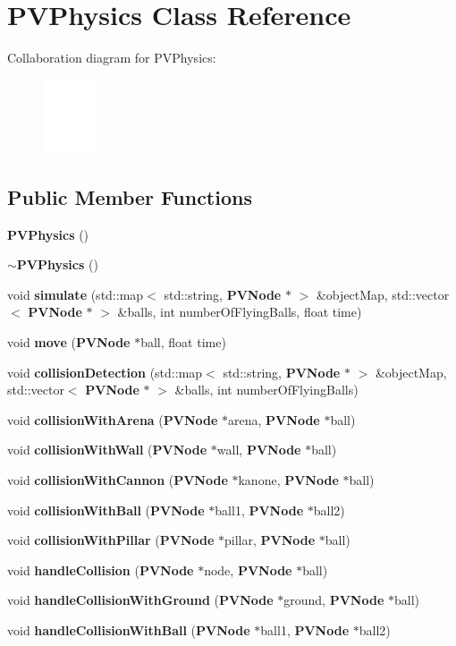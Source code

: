 \section{PVPhysics Class Reference}
\label{class_p_v_physics}
Collaboration diagram for PVPhysics:\nopagebreak
\begin{figure}[H]
\begin{center}
\leavevmode
\includegraphics[width=44pt]{class_p_v_physics__coll__graph}
\end{center}
\end{figure}
\subsection*{Public Member Functions}
\begin{CompactItemize}
\item 
{\bf PVPhysics} ()
\item 
{\bf $\sim$PVPhysics} ()
\item 
void {\bf simulate} (std::map$<$ std::string, {\bf PVNode} $\ast$ $>$ \&objectMap, std::vector$<$ {\bf PVNode} $\ast$ $>$ \&balls, int numberOfFlyingBalls, float time)
\item 
void {\bf move} ({\bf PVNode} $\ast$ball, float time)
\item 
void {\bf collisionDetection} (std::map$<$ std::string, {\bf PVNode} $\ast$ $>$ \&objectMap, std::vector$<$ {\bf PVNode} $\ast$ $>$ \&balls, int numberOfFlyingBalls)
\item 
void {\bf collisionWithArena} ({\bf PVNode} $\ast$arena, {\bf PVNode} $\ast$ball)
\item 
void {\bf collisionWithWall} ({\bf PVNode} $\ast$wall, {\bf PVNode} $\ast$ball)
\item 
void {\bf collisionWithCannon} ({\bf PVNode} $\ast$kanone, {\bf PVNode} $\ast$ball)
\item 
void {\bf collisionWithBall} ({\bf PVNode} $\ast$ball1, {\bf PVNode} $\ast$ball2)
\item 
void {\bf collisionWithPillar} ({\bf PVNode} $\ast$pillar, {\bf PVNode} $\ast$ball)
\item 
void {\bf handleCollision} ({\bf PVNode} $\ast$node, {\bf PVNode} $\ast$ball)
\item 
void {\bf handleCollisionWithGround} ({\bf PVNode} $\ast$ground, {\bf PVNode} $\ast$ball)
\item 
void {\bf handleCollisionWithBall} ({\bf PVNode} $\ast$ball1, {\bf PVNode} $\ast$ball2)
\end{CompactItemize}


